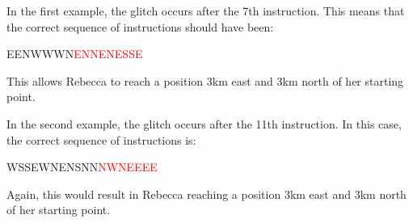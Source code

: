 
\Explanation In the first example, the glitch occurs after the 7th instruction.
This means that the correct sequence of instructions should have been:

EENWWWN\textcolor{red}{ENNENESSE}

This allows Rebecca to reach a position 3km east and 3km north of her starting point.

In the second example, the glitch occurs after the 11th instruction. In this case,
the correct sequence of instructions is:

WSSEWNENSNN\textcolor{red}{NWNEEEE}

Again, this would result in Rebecca reaching a position 3km east and 3km north of her starting point.


